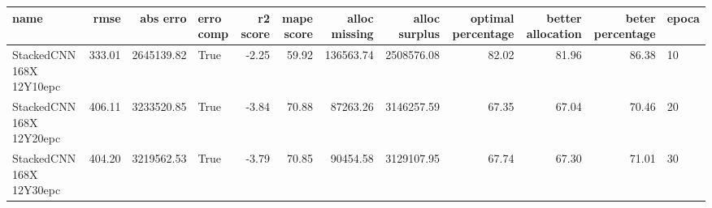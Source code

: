 \begin{tabular}{lrrlrrrrrrrl}
\toprule
name & rmse & abs erro & erro comp & r2 score & mape score & alloc missing & alloc surplus & optimal percentage & better allocation & beter percentage & epoca \\
\midrule
StackedCNN 168X 12Y10epc & 333.01 & 2645139.82 & True & -2.25 & 59.92 & 136563.74 & 2508576.08 & 82.02 & 81.96 & 86.38 & 10 \\
StackedCNN 168X 12Y20epc & 406.11 & 3233520.85 & True & -3.84 & 70.88 & 87263.26 & 3146257.59 & 67.35 & 67.04 & 70.46 & 20 \\
StackedCNN 168X 12Y30epc & 404.20 & 3219562.53 & True & -3.79 & 70.85 & 90454.58 & 3129107.95 & 67.74 & 67.30 & 71.01 & 30 \\
\bottomrule
\end{tabular}
